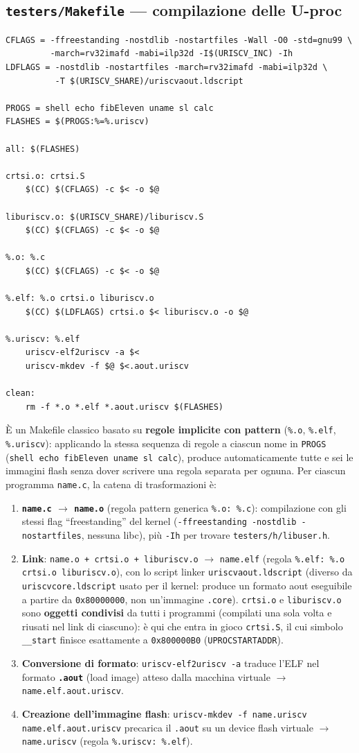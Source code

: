 \documentclass[11pt,a4paper]{article}
\newcommand{\code}[1]{\texttt{#1}}
\begin{document}
\subsection{\code{testers/Makefile} --- compilazione delle U-proc}
\begin{lstlisting}
CFLAGS = -ffreestanding -nostdlib -nostartfiles -Wall -O0 -std=gnu99 \
         -march=rv32imafd -mabi=ilp32d -I$(URISCV_INC) -Ih
LDFLAGS = -nostdlib -nostartfiles -march=rv32imafd -mabi=ilp32d \
          -T $(URISCV_SHARE)/uriscvaout.ldscript

PROGS = shell echo fibEleven uname sl calc
FLASHES = $(PROGS:%=%.uriscv)

all: $(FLASHES)

crtsi.o: crtsi.S
	$(CC) $(CFLAGS) -c $< -o $@

liburiscv.o: $(URISCV_SHARE)/liburiscv.S
	$(CC) $(CFLAGS) -c $< -o $@

%.o: %.c
	$(CC) $(CFLAGS) -c $< -o $@

%.elf: %.o crtsi.o liburiscv.o
	$(CC) $(LDFLAGS) crtsi.o $< liburiscv.o -o $@

%.uriscv: %.elf
	uriscv-elf2uriscv -a $<
	uriscv-mkdev -f $@ $<.aout.uriscv

clean:
	rm -f *.o *.elf *.aout.uriscv $(FLASHES)
\end{lstlisting}
\`E un Makefile classico basato su \textbf{regole implicite con pattern}
(\code{\%.o}, \code{\%.elf}, \code{\%.uriscv}): applicando la stessa
sequenza di regole a ciascun nome in \code{PROGS} (\code{shell echo
fibEleven uname sl calc}), produce automaticamente tutte e sei le immagini
flash senza dover scrivere una regola separata per ognuna. Per ciascun
programma \code{name.c}, la catena di trasformazioni è:
\begin{enumerate}
\item \textbf{\code{name.c} $\to$ \code{name.o}} (regola pattern generica
  \code{\%.o: \%.c}): compilazione con gli stessi flag ``freestanding'' del
  kernel (\code{-ffreestanding -nostdlib -nostartfiles}, nessuna libc), più
  \code{-Ih} per trovare \code{testers/h/libuser.h}.
\item \textbf{Link}: \code{name.o + crtsi.o + liburiscv.o} $\to$
  \code{name.elf} (regola \code{\%.elf: \%.o crtsi.o liburiscv.o}), con lo
  script linker \code{uriscvaout.ldscript} (diverso da
  \code{uriscvcore.ldscript} usato per il kernel: produce un formato aout
  eseguibile a partire da \code{0x80000000}, non un'immagine \code{.core}).
  \code{crtsi.o} e \code{liburiscv.o} sono \textbf{oggetti condivisi} da
  tutti i programmi (compilati una sola volta e riusati nel link di
  ciascuno): è qui che entra in gioco \code{crtsi.S}, il cui simbolo
  \code{\_\_start} finisce esattamente a \code{0x800000B0}
  (\code{UPROCSTARTADDR}).
\item \textbf{Conversione di formato}: \code{uriscv-elf2uriscv -a}
  traduce l'ELF nel formato \textbf{\code{.aout}} (load image) atteso dalla
  macchina virtuale $\to$ \code{name.elf.aout.uriscv}.
\item \textbf{Creazione dell'immagine flash}: \code{uriscv-mkdev -f
  name.uriscv name.elf.aout.uriscv} precarica il \code{.aout} su un device
  flash virtuale $\to$ \code{name.uriscv} (regola \code{\%.uriscv:
  \%.elf}).
\end{enumerate}
\end{document}
